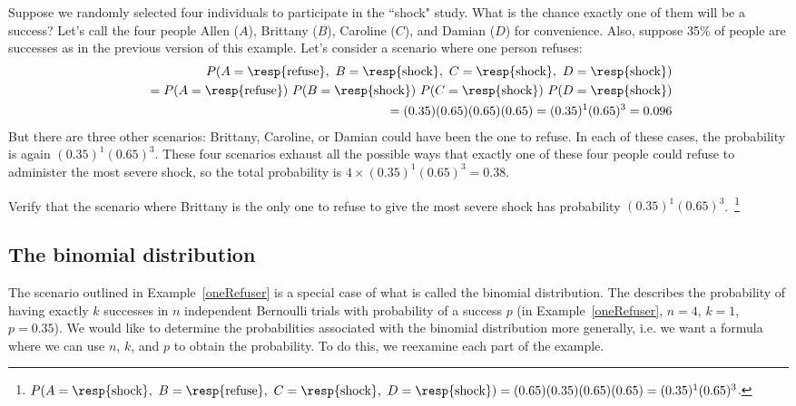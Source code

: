 \begin{example}{Suppose we randomly selected four individuals to participate in the ``shock" study. What is the chance exactly one of them will be a success?  Let's call the four people Allen ($A$), Brittany ($B$), Caroline ($C$), and Damian ($D$) for convenience. Also, suppose 35\% of people are successes as in the previous version of this example.}\label{oneRefuser}
Let's consider a scenario where one person refuses:
\begin{eqnarray*}
&&P(A=\text{\resp{refuse}},\text{ }B=\text{\resp{shock}},\text{ }C=\text{\resp{shock}},\text{ }D=\text{\resp{shock}}) \\
 &&\quad =  P(A=\text{\resp{refuse}})\ P(B=\text{\resp{shock}})\ P(C=\text{\resp{shock}})\ P(D=\text{\resp{shock}}) \\
 &&\quad =  (0.35)  (0.65)  (0.65)  (0.65) = (0.35)^1 (0.65)^3 = 0.096
\end{eqnarray*}
But there are three other scenarios: Brittany, Caroline, or Damian could have been the one to refuse. In each of these cases, the probability is again $(0.35)^1(0.65)^3$. These four scenarios exhaust all the possible ways that exactly one of these four people could refuse to administer the most severe shock, so the total probability is $4\times(0.35)^1(0.65)^3 = 0.38$.
\end{example}

\begin{exercise}
Verify that the scenario where Brittany is the only one to refuse to give the most severe shock has probability $(0.35)^1(0.65)^3$.~\footnote{$P(A=\text{\resp{shock}},\text{ }B=\text{\resp{refuse}},\text{ }C=\text{\resp{shock}},\text{ }D=\text{\resp{shock}}) = (0.65)(0.35)(0.65)(0.65) = (0.35)^1(0.65)^3$.}
\end{exercise}

\textC{\newpage}


\subsection{The binomial distribution}

The scenario outlined in Example~\ref{oneRefuser} is a special case of what is called the binomial distribution. The  describes the probability of having exactly $k$ successes in $n$ independent Bernoulli trials with probability of a success $p$  (in Example~\ref{oneRefuser}, $n=4$, $k=1$, $p=0.35$). We would like to determine the probabilities associated with the binomial distribution more generally, i.e. we want a formula where we can use $n$, $k$, and $p$ to obtain the probability. To do this, we reexamine each part of the example.

